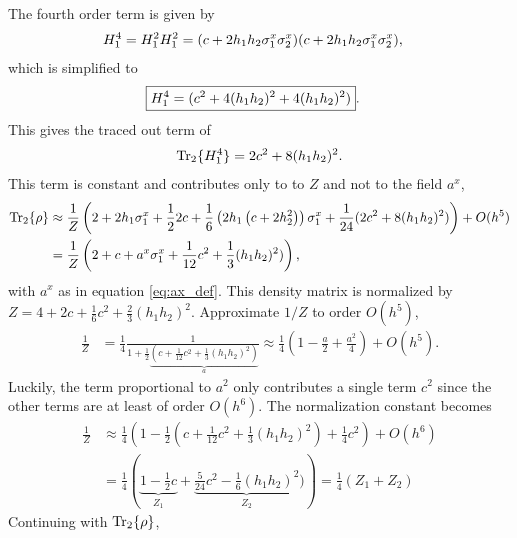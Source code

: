 \noindent The fourth order term is given by
\begin{align*}
    H_1^4 &= H_1^2 H_1^2 = (c + 2 h_1 h_2 {\sigma^{x}_1} {\sigma^{x}_2}) (c + 2 h_1 h_2 {\sigma^{x}_1} {\sigma^{x}_2}),
\end{align*}
which is simplified to
\begin{align*}
    \Aboxed{H_1^4 & = (c^2 + 4 (h_1 h_2)^2 + 4 (h_1 h_2)^2)}.
\end{align*}
This gives the traced out term of
\begin{align*}
    \Tr_2\{H_1^4\} = 2c^2 + 8(h_1 h_2)^2.
\end{align*}
This term is constant and contributes only to to $Z$ and not to the field $a^x$,
\begin{align*}
    \Tr_2\{\rho\}  & \approx \frac{1}{Z} \left(2+2 h_1 {\sigma^{x}_1} + \frac{1}{2} 2c+\frac{1}{6}\left(2h_1 \left(c  + 2 h_2^2 \right)\right){\sigma^{x}_1} + \frac{1}{24}(2c^2+ 8(h_1 h_2)^2)\right) + O(h^5)\\
    & = \frac{1}{Z} \left(2+c+ a^x {\sigma^{x}_1} + \frac{1}{12} c^2 + \frac{1}{3}(h_1 h_2)^2 )\right),
\end{align*}
with $a^x$ as in equation \ref{eq:ax_def}. This density matrix is normalized by $Z = 4+ 2c + \frac{1}{6} c^2 + \frac{2}{3}(h_1 h_2)^2$. Approximate $1/Z$ to order $O(h^5)$,
\begin{align*}
    \frac{1}{Z} & = \frac{1}{4}\frac{1}{1 + \frac{1}{2}\underbrace{(c+ \frac{1}{12}c^2+ \frac{1}{3}(h_1h_2)^2)}_{a}} \approx \frac{1}{4}\left(1 - \frac{a}{2} + \frac{a^2}{4}\right) + O(h^5).
\end{align*}
Luckily, the term proportional to $a^2$ only contributes a single term $c^2$ since the other terms are at least of order $O(h^6)$. The normalization constant becomes
\begin{align}
    \frac{1}{Z} &\approx \frac{1}{4}\left(1 - \frac{1}{2}(c+\frac{1}{12}c^2 +\frac{1}{3} (h_1h_2)^2) + \frac{1}{4}c^2 \right)+ O(h^6)\nonumber\\
    &= \frac{1}{4}\left(\underbrace{1 - \frac{1}{2}c}_{Z_1} + \underbrace{\frac{5}{24}c^2 - \frac{1}{6} (h_1h_2)^2}_{Z_2}) \right) = \frac{1}{4}(Z_1 + Z_2)\label{eq:norm_z}
\end{align}
Continuing with $\Tr_2\{\rho\}$,

